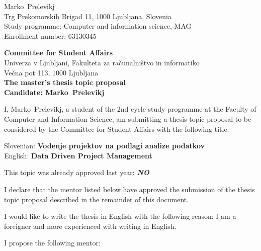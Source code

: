 \documentclass[a4paper, 12pt]{article}
\begin{document}
\newcommand{\ImeKandidata}{Marko} %
\newcommand{\PriimekKandidata}{Prelevikj} %
\newcommand{\VpisnaStevilka}{63130345} %
\newcommand{\StudyProgramme}{Computer and information science, MAG} %
\newcommand{\NaslovBivalisca}{Trg Prekomorskih Brigad 11, 1000 Ljubljana, Slovenia} %
\newcommand{\SLONaslov}{Vodenje projektov na podlagi analize podatkov} %
\newcommand{\ENGNaslov}{Data Driven Project Management} %


\newcommand{\Kandidat}{\ImeKandidata~\PriimekKandidata}
\noindent
\Kandidat\\
\NaslovBivalisca \\
Study programme: \StudyProgramme \\
Enrollment number: \VpisnaStevilka
\bigskip

{\bf Committee for Student Affairs}\\
Univerza v Ljubljani, Fakulteta za računalništvo in informatiko\\
Večna pot 113, 1000 Ljubljana\\

{\Large\bf
{\centering
    The master’s thesis topic proposal \\%
\large Candidate: \Kandidat \\[10mm]}}


I, \Kandidat, a student of the 2nd cycle study programme at the Faculty of Computer and Information Science, am submitting a thesis topic proposal to be considered by the Committee for Student Affairs with the following title:

Slovenian: {\bf \SLONaslov}\\
English: {\bf \ENGNaslov}

This topic was already approved last year: {\bf \textit{NO}}

I declare that the mentor listed below have approved the submission of the thesis topic proposal described in the remainder of this document.

I would like to write the thesis in English with the following reason: I am a foreigner and more experienced with writing in English.

I propose the following mentor:
\end{document}
